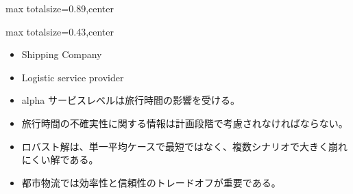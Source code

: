 \begin{minipage}[t]{0.58\textwidth}
\begin{adjustbox}{max totalsize={\textwidth}{0.89\textheight},center}
\begin{minipage}{\textwidth}
\end{minipage}
\end{adjustbox}
\end{minipage}


\clearpage
{}
\begin{minipage}[t]{0.405\textwidth}
\begin{adjustbox}{max totalsize={\textwidth}{0.43\textheight},center}
\begin{minipage}{\textwidth}\scriptsize
{}\begin{itemize}
\item Shipping Company
\item Logistic service provider
\item alpha サービスレベルは旅行時間の影響を受ける。
\item 旅行時間の不確実性に関する情報は計画段階で考慮されなければならない。
\end{itemize}\begin{itemize}
\item ロバスト解は、単一平均ケースで最短ではなく、複数シナリオで大きく崩れにくい解である。
\item 都市物流では効率性と信頼性のトレードオフが重要である。
\end{itemize}
\end{minipage}
\end{adjustbox}
\end{minipage}\hfill

